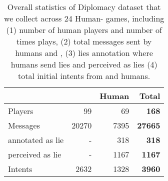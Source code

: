 \begin{table}[t]
\centering
\begin{tabular}{lrrr}
\hline
 & \cicero{}&Human&\textbf{Total}\\ 
\hline
 Players&99&69&\textbf{168}\\
 Messages& 20270&7395&\textbf{27665}\\
\hspace{3mm} annotated as lie&-&318&\textbf{318}\\
\hspace{3mm} perceived as lie&-&1167&\textbf{1167}\\
 Intents&2632&1328&\textbf{3960}\\
\hline
\end{tabular}
\caption{Overall statistics of Diplomacy dataset that we collect across 24 Human-\cicero{} games, including (1) number of human players and number of times \cicero{} plays, (2) total messages sent by humans and \cicero{}, (3) lies annotation where humans send lies and perceived as lies (4) total initial intents from \cicero{} and humans.}
\label{tab:overall_stat}
\end{table}

